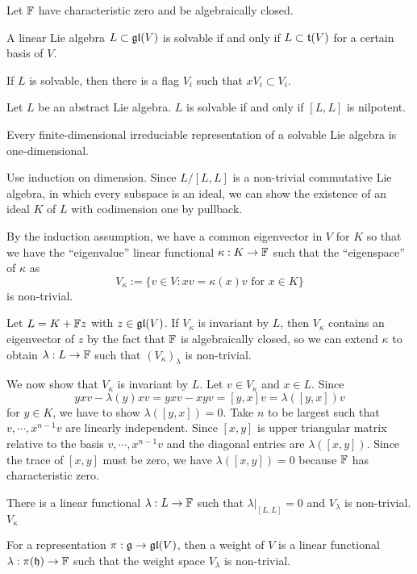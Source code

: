 \documentclass{../../large}
\begin{document}
\begin{prb}
Let $\mathbb{F}$ have characteristic zero and be algebraically closed.
\begin{parts}
\item A linear Lie algebra $L\subset\mathfrak{gl}(V)$ is solvable if and only if $L\subset\mathfrak{t}(V)$ for a certain basis of $V$.
\item If $L$ is solvable, then there is a flag $V_i$ such that $xV_i\subset V_i$.
\item Let $L$ be an abstract Lie algebra. $L$ is solvable if and only if $[L,L]$ is nilpotent.
\item Every finite-dimensional irreduciable representation of a solvable Lie algebra is one-dimensional.
\end{parts}
\end{prb}
\begin{pf}
Use induction on dimension.
Since $L/[L,L]$ is a non-trivial commutative Lie algebra, in which every subspace is an ideal, we can show the existence of an ideal $K$ of $L$ with codimension one by pullback.

By the induction assumption, we have a common eigenvector in $V$ for $K$ so that we have the ``eigenvalue'' linear functional $\kappa:K\to\mathbb{F}$ such that the ``eigenspace'' of $\kappa$ as
\[V_\kappa:=\{v\in V:xv=\kappa(x)v\text{ for }x\in K\}\]
is non-trivial.

Let $L=K+\mathbb{F} z$ with $z\in\mathfrak{gl}(V)$.
If $V_\kappa$ is invariant by $L$, then $V_\kappa$ contains an eigenvector of $z$ by the fact that $\mathbb{F}$ is algebraically closed, so we can extend $\kappa$ to obtain $\lambda:L\to\mathbb{F}$ such that $(V_\kappa)_\lambda$ is non-trivial.

We now show that $V_\kappa$ is invariant by $L$.
Let $v\in V_\kappa$ and $x\in L$.
Since
\[yxv-\lambda(y)xv=yxv-xyv=[y,x]v=\lambda([y,x])v\]
for $y\in K$, we have to show $\lambda([y,x])=0$.
Take $n$ to be largest such that $v,\cdots,x^{n-1}v$ are linearly independent.
Since $[x,y]$ is upper triangular matrix relative to the basis $v,\cdots,x^{n-1}v$ and the diagonal entries are $\lambda([x,y])$.
Since the trace of $[x,y]$ must be zero, we have $\lambda([x,y])=0$ because $\mathbb{F}$ has characteristic zero.

\end{pf}

There is a linear functional $\lambda:L\to\mathbb{F}$ such that $\lambda|_{[L,L]}=0$ and $V_\lambda$ is non-trivial.
$V_\kappa$


For a representation $\pi:\mathfrak{g}\to\mathfrak{gl}(V)$, then a weight of $V$ is a linear functional $\lambda:\pi(\mathfrak{h})\to\mathbb{F}$ such that the weight space $V_\lambda$ is non-trivial.
\end{document}
